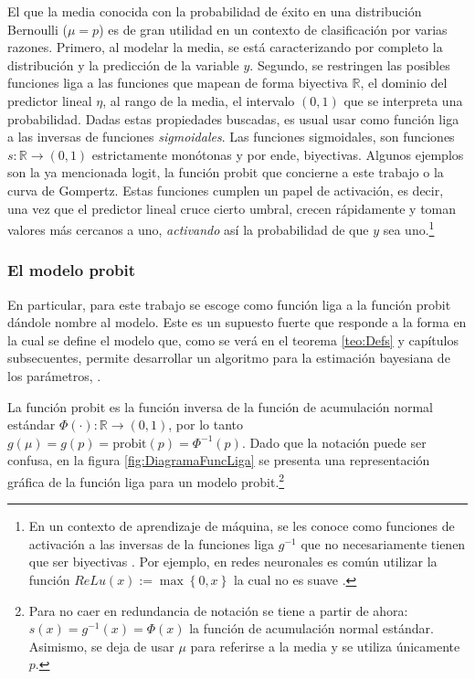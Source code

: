 \documentclass[../Main/Main.tex]{subfiles}
\begin{document}
El que la media conocida con la probabilidad de éxito en una distribución Bernoulli ($\mu = p$) es de gran utilidad en un contexto de clasificación por varias razones. Primero, al modelar la media, se está caracterizando por completo la distribución y la predicción de la variable $y$. Segundo, se restringen las posibles funciones liga a las funciones que mapean de forma biyectiva $\mathbb{R}$, el dominio del predictor lineal $\eta$, al rango de la media, el intervalo $(0,1)$ que se interpreta una probabilidad. Dadas estas propiedades buscadas, es usual usar como función liga a las inversas de funciones \textit{sigmoidales}. Las funciones sigmoidales, son funciones \linebreak $s:\mathbb{R}\rightarrow (0,1)$ estrictamente monótonas y por ende, biyectivas. Algunos ejemplos son la ya mencionada logit, la función probit que concierne a este trabajo o la curva de Gompertz. Estas funciones cumplen un papel de activación, es decir, una vez que el predictor lineal cruce cierto umbral, crecen rápidamente y toman valores más cercanos a uno, \textit{activando} así la probabilidad de que $y$ sea uno.\footnote{En un contexto de aprendizaje de máquina, se les conoce como funciones de activación a las inversas de la funciones liga $g^{-1}$ que no necesariamente tienen que ser biyectivas \autocite{bishop2006pattern}. Por ejemplo, en redes neuronales es común utilizar la función $\textit{ReLu}(x):= \max\left\{0,x\right\}$ la cual no es suave \autocite{3blue1brown2017}.}

\subsubsection*{El modelo probit}
En particular, para este trabajo se escoge como función liga a la función probit dándole nombre al modelo. Este es un supuesto fuerte que responde a la forma en la cual se define el modelo que, como se verá en el teorema \ref{teo:Defs} y capítulos subsecuentes, permite desarrollar un algoritmo para la estimación bayesiana de los parámetros, \citet{albert1993bayesian}. 

La función probit es la función inversa de la función de acumulación normal estándar $\Phi(\cdot):\mathbb{R}\rightarrow(0,1)$, por lo tanto $g(\mu) = g(p) = \text{probit}(p) = \Phi^{-1}(p)$. Dado que la notación puede ser confusa, en la figura \ref{fig:DiagramaFuncLiga} se presenta una representación gráfica de la función liga para un modelo probit.\footnote{Para no caer en redundancia de notación se tiene a partir de ahora: $s(x) = g^{-1}(x) = \Phi(x)$ la función de acumulación normal estándar. Asimismo, se deja de usar $\mu$ para referirse a la media y se utiliza únicamente $p$.}
\end{document}
